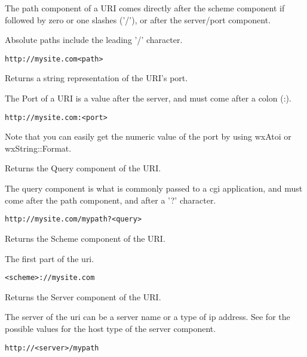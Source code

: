 The path component of a URI comes
directly after the scheme component
if followed by zero or one slashes ('/'),
or after the server/port component.

Absolute paths include the leading '/'
character.

\tt{http://mysite.com<path>}

\label{wxurigetport}


Returns a string representation of the URI's port.

The Port of a URI is a value after the server, and 
must come after a colon (:).

\tt{http://mysite.com:<port>}

Note that you can easily get the numeric value of the port
by using wxAtoi or wxString::Format.

\label{wxurigetquery}


Returns the Query component of the URI.

The query component is what is commonly passed to a 
cgi application, and must come after the path component,
and after a '?' character.

\tt{http://mysite.com/mypath?<query>}


\label{wxurigetscheme}


Returns the Scheme component of the URI.

The first part of the uri.

\tt{<scheme>://mysite.com}


\label{wxurigetserver}


Returns the Server component of the URI.

The server of the uri can be a server name or 
a type of ip address.  See
 for the
possible values for the host type of the 
server component.

\tt{http://<server>/mypath}


\label{wxurigetuser}


